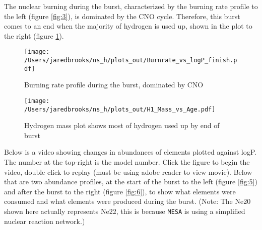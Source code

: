 \documentclass{article}
\begin{document}
        \pagebreak

        The nuclear burning during the burst, characterized by the burning rate profile to the left (figure \ref{fig:3}), is dominated by the CNO cycle.  Therefore, this burst comes to an end when the majority of hydrogen is used up, shown in the plot to the right (figure \ref{fig:4}).

        \begin{figure}[H]
                \begin{minipage}[b]{0.5\linewidth}
                       \centering
                       \texttt{[image: /Users/jaredbrooks/ns\_h/plots\_out/Burnrate\_vs\_logP\_finish.pdf]}
                       \caption{Burning rate profile during the burst, dominated by CNO}
                       \label{fig:3}
                \end{minipage}
                \hspace{0cm}
                \begin{minipage}[b]{0.5\linewidth}
                       \centering
                       \texttt{[image: /Users/jaredbrooks/ns\_h/plots\_out/H1\_Mass\_vs\_Age.pdf]}
                       \caption{Hydrogen mass plot shows most of hydrogen used up by end of burst}
                       \label{fig:4}
                \end{minipage}
        \end{figure}

        \pagebreak

        Below is a video showing changes in abundances of elements plotted against logP.  The number at the top-right is the model number.  Click the figure to begin the video, double click to replay (must be using adobe reader to view movie).  Below that are two abundance profiles, at the start of the burst to the left (figure \ref{fig:5}) and after the burst to the right (figure \ref{fig:6}), to show what elements were consumed and what elements were produced during the burst.  (Note: The Ne20 shown here actually represents Ne22, this is because \texttt{MESA} is using a simplified nuclear reaction network.)

        \begin{figure}[H]
        \end{figure}
\end{document}
